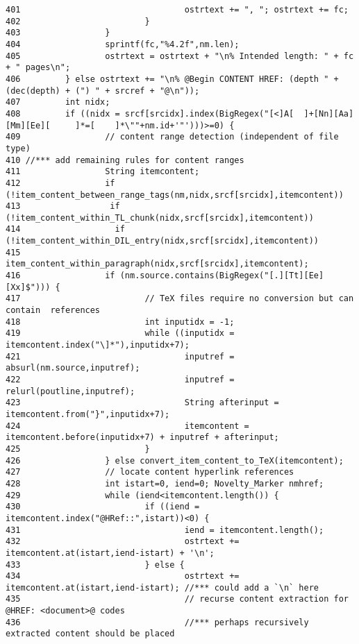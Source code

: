 \begin{verbatim}
401                                 ostrtext += ", "; ostrtext += fc;
402                         }
403                 }
404                 sprintf(fc,"%4.2f",nm.len);
405                 ostrtext = ostrtext + "\n% Intended length: " + fc + " pages\n";
406         } else ostrtext += "\n% @Begin CONTENT HREF: (depth " + (dec(depth) + (") " + srcref + "@\n"));
407         int nidx;
408         if ((nidx = srcf[srcidx].index(BigRegex("[<]A[  ]+[Nn][Aa][Mm][Ee][     ]*=[    ]*\""+nm.id+'"')))>=0) {
409                 // content range detection (independent of file type)
410 //*** add remaining rules for content ranges
411                 String itemcontent;
412                 if (!item_content_between_range_tags(nm,nidx,srcf[srcidx],itemcontent))
413                  if (!item_content_within_TL_chunk(nidx,srcf[srcidx],itemcontent))
414                   if (!item_content_within_DIL_entry(nidx,srcf[srcidx],itemcontent))
415                    item_content_within_paragraph(nidx,srcf[srcidx],itemcontent);
416                 if (nm.source.contains(BigRegex("[.][Tt][Ee][Xx]$"))) {
417                         // TeX files require no conversion but can contain  references
418                         int inputidx = -1;
419                         while ((inputidx = itemcontent.index("\]*"),inputidx+7);
421                                 inputref = absurl(nm.source,inputref);
422                                 inputref = relurl(poutline,inputref);
423                                 String afterinput = itemcontent.from("}",inputidx+7);
424                                 itemcontent = itemcontent.before(inputidx+7) + inputref + afterinput;
425                         }
426                 } else convert_item_content_to_TeX(itemcontent);
427                 // locate content hyperlink references
428                 int istart=0, iend=0; Novelty_Marker nmhref;
429                 while (iend<itemcontent.length()) {
430                         if ((iend = itemcontent.index("@HRef::",istart))<0) {
431                                 iend = itemcontent.length();
432                                 ostrtext += itemcontent.at(istart,iend-istart) + '\n';
433                         } else {
434                                 ostrtext += itemcontent.at(istart,iend-istart); //*** could add a `\n` here
435                                 // recurse content extraction for @HREF: <document>@ codes
436                                 //*** perhaps recursively extracted content should be placed

\end{verbatim}
